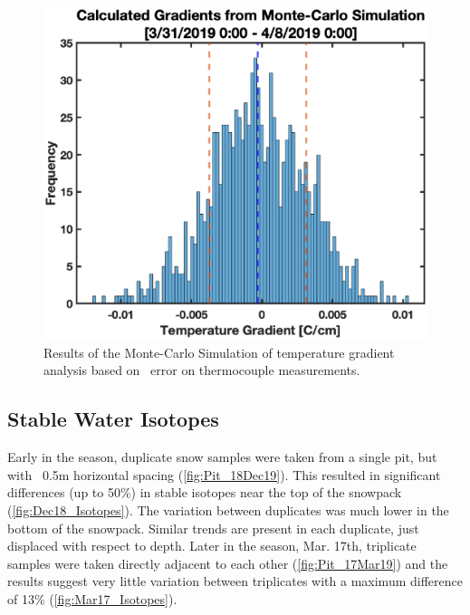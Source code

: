  \begin{figure}[H]
    \centering
    \includegraphics[width=0.7\linewidth]{figures/Uncertainty/MC_Grad.eps}
    \caption{Results of the Monte-Carlo Simulation of temperature gradient analysis based on \isostd \  error on thermocouple measurements.}
    \label{fig:MC_Grad}
 \end{figure}

\subsection{Stable Water Isotopes}
Early in the season, duplicate snow samples were taken from a single pit, but with ~0.5m horizontal spacing (\ref{fig:Pit_18Dec19}). This resulted in significant differences (up to 50\%) in stable isotopes near the top of the snowpack (\ref{fig:Dec18_Isotopes}). The variation between duplicates was much lower in the bottom of the snowpack. Similar trends are present in each duplicate, just displaced with respect to depth. Later in the season, Mar. 17th, triplicate samples were taken directly adjacent to each other (\ref{fig:Pit_17Mar19}) and the results suggest very little variation between triplicates with a maximum difference of 13\% (\ref{fig:Mar17_Isotopes}). 

